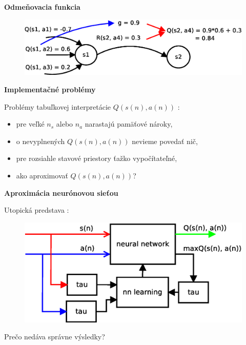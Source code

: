 \documentclass[xcolor=dvipsnames]{beamer}
\begin{document}
\begin{frame}{\bf Odmeňovacia funkcia}

\begin{figure}[!htb]
\includegraphics[scale=.4]{../diagrams/q_learning_detail.eps}
\end{figure}


\end{frame}



\begin{frame}{\bf Implementačné problémy}

Problémy tabuľkovej interpretácie $Q(s(n), a(n))$ :

\begin{itemize}
\item pre veľké ${n_s}$  alebo  ${n_a}$ narastajú pamäťové nároky,
\item o nevyplnených $Q(s(n), a(n))$ nevieme povedať nič,
\item pre rozsiahle stavové priestory ťažko vypočítateľné,
\item ako aproximovať $Q(s(n), a(n))$?
\end{itemize}

\end{frame}


\begin{frame}{\bf Aproximácia neurónovou sieťou}

Utopická predstava :

\begin{figure}[!htb]
\includegraphics[scale=.5]{../diagrams/q_learning_nn.eps}
\end{figure}

Prečo nedáva správne výsledky?
\end{frame}
\end{document}
